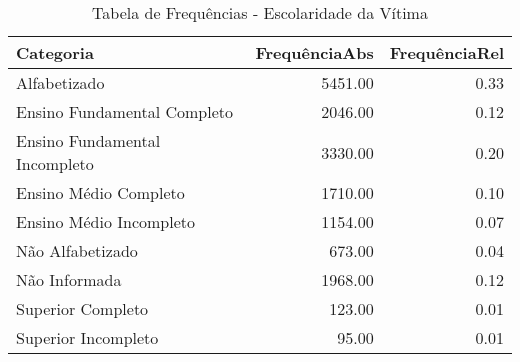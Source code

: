 \begin{table}[ht]
\centering
\begin{tabular}{lrr}
  \hline
Categoria & FrequênciaAbs & FrequênciaRel \\ 
  \hline
Alfabetizado & 5451.00 & 0.33 \\ 
  Ensino Fundamental Completo & 2046.00 & 0.12 \\ 
  Ensino Fundamental Incompleto & 3330.00 & 0.20 \\ 
  Ensino Médio Completo & 1710.00 & 0.10 \\ 
  Ensino Médio Incompleto & 1154.00 & 0.07 \\ 
  Não Alfabetizado & 673.00 & 0.04 \\ 
  Não Informada & 1968.00 & 0.12 \\ 
  Superior Completo & 123.00 & 0.01 \\ 
  Superior Incompleto & 95.00 & 0.01 \\ 
   \hline
\end{tabular}
\caption{Tabela de Frequências - Escolaridade da Vítima} 
\end{table}
